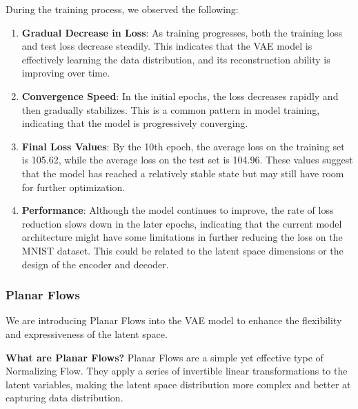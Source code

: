\documentclass[11pt]{article}
\begin{document}
    During the training process, we observed the following:

\begin{enumerate}
\def\labelenumi{\arabic{enumi}.}
\item
  \textbf{Gradual Decrease in Loss}: As training progresses, both the
  training loss and test loss decrease steadily. This indicates that the
  VAE model is effectively learning the data distribution, and its
  reconstruction ability is improving over time.
\item
  \textbf{Convergence Speed}: In the initial epochs, the loss decreases
  rapidly and then gradually stabilizes. This is a common pattern in
  model training, indicating that the model is progressively converging.
\item
  \textbf{Final Loss Values}: By the 10th epoch, the average loss on the
  training set is 105.62, while the average loss on the test set is
  104.96. These values suggest that the model has reached a relatively
  stable state but may still have room for further optimization.
\item
  \textbf{Performance}: Although the model continues to improve, the
  rate of loss reduction slows down in the later epochs, indicating that
  the current model architecture might have some limitations in further
  reducing the loss on the MNIST dataset. This could be related to the
  latent space dimensions or the design of the encoder and decoder.
\end{enumerate}

    \subsubsection{Planar Flows}\label{planar-flows}

We are introducing Planar Flows into the VAE model to enhance the
flexibility and expressiveness of the latent space.

\textbf{What are Planar Flows?} Planar Flows are a simple yet effective
type of Normalizing Flow. They apply a series of invertible linear
transformations to the latent variables, making the latent space
distribution more complex and better at capturing data distribution.
\end{document}

